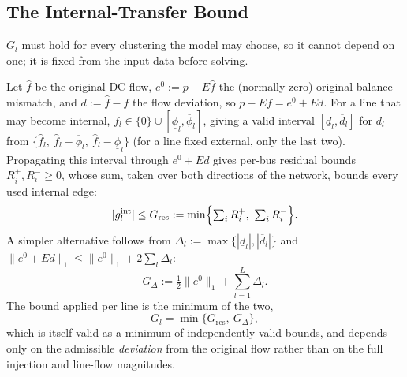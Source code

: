 \documentclass[journal]{IEEEtran}
\newcommand{\gint}{g^{\mathrm{int}}}
\begin{document}
\subsection{The Internal-Transfer Bound}
\label{sec:tight}

$G_l$ must hold for every clustering the model may choose, so it cannot depend on one; it is fixed from the input data before solving.

Let $\widehat f$ be the original DC flow, $e^0:=p-E\widehat f$ the (normally zero) original balance mismatch, and $d:=\widehat f-f$ the flow deviation, so $p-Ef=e^0+Ed$. For a line that may become internal, $f_l\in\{0\}\cup[\underline\phi_l,\overline\phi_l]$, giving a valid interval $[\underline d_l,\overline d_l]$ for $d_l$ from $\{\widehat f_l,\ \widehat f_l-\overline\phi_l,\ \widehat f_l-\underline\phi_l\}$ (for a line fixed external, only the last two). Propagating this interval through $e^0+Ed$ gives per-bus residual bounds $R_i^+,R_i^-\ge0$, whose sum, taken over both directions of the network, bounds every used internal edge:
\begin{equation}
 |\gint_l|\le G_{\mathrm{res}}:=\min\Bigl\{\textstyle\sum_iR_i^+,\ \sum_iR_i^-\Bigr\}.
 \label{eq:G_residual}
\end{equation}
A simpler alternative follows from $\Delta_l:=\max\{|\underline d_l|,|\overline d_l|\}$ and $\|e^0+Ed\|_1\le\|e^0\|_1+2\sum_l\Delta_l$:
\begin{equation}
 G_{\Delta}:=\tfrac12\|e^0\|_1+\sum_{l=1}^{L}\Delta_l.
 \label{eq:G_delta}
\end{equation}
The bound applied per line is the minimum of the two,
\begin{equation}
 G_l=\min\bigl\{G_{\mathrm{res}},\ G_{\Delta}\bigr\},
 \label{eq:G_recommended}
\end{equation}
which is itself valid as a minimum of independently valid bounds, and depends only on the admissible \emph{deviation} from the original flow rather than on the full injection and line-flow magnitudes.
\end{document}
